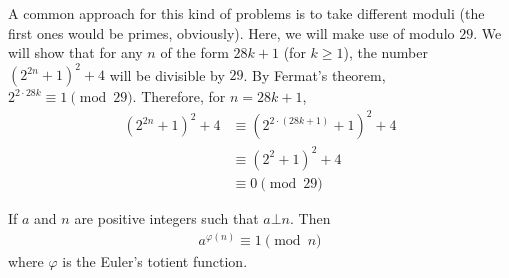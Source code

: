 	\begin{solution}
		A common approach for this kind of problems is to take different moduli (the first ones would be primes, obviously). Here, we will make use of modulo $29$. We will show that for any $n$ of the form $28k+1$ (for $k \geq 1$), the number $(2^{2n}+1 )^2+4$ will be divisible by $29$. By Fermat's theorem, $2^{2 \cdot 28k} \equiv 1 \pmod{29}$. Therefore, for $n=28k+1$,
			\begin{align*}
				(2^{2n}+1 )^2+4 &\equiv (2^{2\cdot (28k+1)}+1 )^2+4\\
								&\equiv (2^{2}+1 )^2+4\\
								&\equiv 0 \pmod{29}
			\end{align*}

	\end{solution}

	\begin{theorem}
		If $a$ and $n$ are positive integers such that $a \bot n$. Then
		\begin{align*}
			a^{\varphi(n)} \equiv 1 \pmod n
		\end{align*}
		where $\varphi$ is the Euler's totient function.
	\end{theorem}

